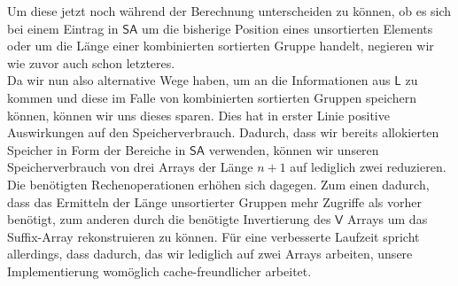 Um diese jetzt noch während der Berechnung unterscheiden zu können, ob es sich bei einem Eintrag in $\mathsf{SA}$ um die bisherige Position eines unsortierten Elements oder um die Länge einer kombinierten sortierten Gruppe handelt, negieren wir wie zuvor auch schon letzteres.\\
Da wir nun also alternative Wege haben, um an die Informationen aus $\mathsf{L}$ zu kommen und diese im Falle von kombinierten sortierten Gruppen speichern können, können wir uns dieses sparen. Dies hat in erster Linie positive Auswirkungen auf den Speicherverbrauch. Dadurch, dass wir bereits allokierten Speicher in Form der Bereiche in $\mathsf{SA}$ verwenden, können wir unseren Speicherverbrauch von drei Arrays der Länge $n+1$ auf lediglich zwei reduzieren. Die benötigten Rechenoperationen erhöhen sich dagegen. Zum einen dadurch, dass das Ermitteln der Länge unsortierter Gruppen mehr Zugriffe als vorher benötigt, zum anderen durch die benötigte Invertierung des $\mathsf{V}$ Arrays um das Suffix-Array rekonstruieren zu können. Für eine verbesserte Laufzeit spricht allerdings, dass dadurch, das wir lediglich auf zwei Arrays arbeiten, unsere Implementierung womöglich cache-freundlicher arbeitet.
